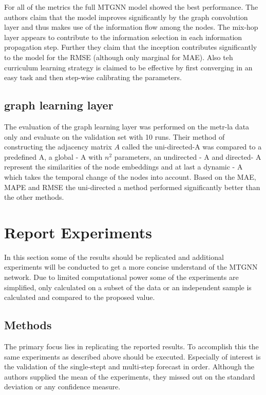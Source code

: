 \documentclass[letterpaper,twocolumn,11pt]{article}
\begin{document}
    For all of the metrics the full MTGNN model showed the best performance.
    The authors claim that the model improves significantly by the graph convolution layer and thus makes use of the information flow among the nodes.
    The mix-hop layer appears to contribute to the information selection in each information propagation step.
    Further they claim that the inception contributes significantly to the model for the RMSE (although only marginal for MAE).
    Also teh curriculum learning strategy is claimed to be effective by first converging in an easy task and then step-wise calibrating the parameters.

    \subsection{graph learning layer}
    The evaluation of the graph learning layer was performed on the metr-la data only and evaluate on the validation set with 10 runs.
    Their method of constructing the adjacency matrix $A$ called the uni-directed-A was compared to a predefined A, a global - A with $n^2$ parameters, an undirected - A and directed- A represent the similarities of the node embeddings and at last a dynamic - A which takes the temporal change of the nodes into account.
    Based on the MAE, MAPE and RMSE the uni-directed a method performed significantly better than the other methods.


    \section{Report Experiments}
    In this section some of the results should be replicated and additional experiments will be conducted to get a more concise understand of the MTGNN network.
    Due to limited computational power some of the experiments are simplified, only calculated on a subset of the data or an independent sample is calculated and compared to the proposed value.

    \subsection{Methods}
    The primary focus lies in replicating the reported results.
    To accomplish this the same experiments as described above should be executed.
    Especially of interest is the validation of the single-stept and multi-step forecast in order.
    Although the authors supplied the mean of the experiments, they missed out on the standard deviation or any confidence measure.
\end{document}

